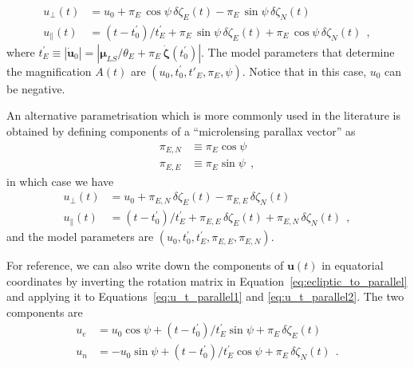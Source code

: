 \documentclass[12pt,dvipsnames]{report}
\newcommand{\hquad}{~~}
\begin{document}
\begin{align}
    u_\bot(t)      & = u_0 + \pi_E\,\cos\psi\,\delta \zeta_E(t) - \pi_E\,\sin\psi\,\delta \zeta_N(t)
    \label{eq:u_t_parallel1}                                                                         \\
    u_\parallel(t) & =(t-t_0^\prime)/t_E^\prime + \pi_E\,\sin\psi\,\delta \zeta_E(t) +
    \pi_E\,\cos\psi\,\delta \zeta_N(t) \label{eq:u_t_parallel2}
    \hquad,
\end{align}
where $t_E^\prime \equiv|\dot{\mathbf{u}}_0|=|\boldsymbol\mu_{LS}/\theta_E  + \pi_E\,\dot{\boldsymbol \zeta}(t_0^\prime)|$.
The model parameters that determine the magnification $A(t)$ are 
$\left(u_0,t_0^\prime,t'_E,\pi_E,\psi\right)$. Notice that in this case, $u_0$
can be negative.

An alternative parametrisation which is more commonly used in the literature is obtained by
defining components of a ``microlensing parallax vector'' as
\begin{align}
    \pi_{E,N} & \equiv \pi_E\cos\psi \\
    \pi_{E,E} & \equiv \pi_E\sin\psi
    \hquad,
\end{align}
in which case we have
\begin{align}
    u_\bot(t)      & = u_0 + \pi_{E,N}\,\delta \zeta_E(t) - \pi_{E,E}\,\delta \zeta_N(t) \\
    u_\parallel(t) & =(t-t_0^\prime)/t_E^\prime + \pi_{E,E}\,\delta\zeta_E(t) +
    \pi_{E,N}\,\delta\zeta_N(t)
    \hquad,
\end{align}
and the model parameters are $\left(u_0,t_0^\prime,t_E^\prime,\pi_{E,E},\pi_{E,N}\right)$.

For reference, we can also write down the components of $\mathbf{u}(t)$ in
equatorial coordinates by inverting the rotation matrix in
Equation~\ref{eq:ecliptic_to_parallel} and applying it to
Equations~\ref{eq:u_t_parallel1} and \ref{eq:u_t_parallel2}. 
The two components are 
\begin{align}
    u_e & =u_0\cos\psi + (t-t_0^\prime)/t_E^\prime\sin\psi + \pi_E\,\delta\zeta_E(t)  
    \label{eq:u_t_east}\\
    u_n & =-u_0\sin\psi + (t-t_0^\prime)/t_E^\prime\cos\psi + \pi_E\,\delta\zeta_N(t)
    \hquad.
    \label{eq:u_t_north}
\end{align}
\end{document}
